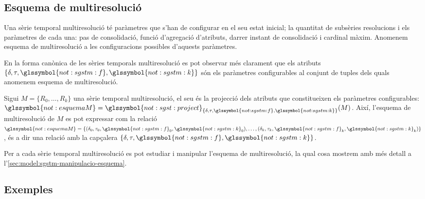 \subsection{Esquema de multiresolució}

Una sèrie temporal multiresolució té paràmetres que
s'han de configurar en el seu estat inicial; la quantitat de subsèries
resolucions i els paràmetres de cada una: pas de consolidació, funció
d'agregació d'atributs, darrer instant de consolidació i cardinal
màxim. Anomenem esquema de multiresolució a les configuracions
possibles d'aquests paràmetres.


En la forma canònica de les sèries temporals multiresolució es pot
observar més clarament que els atributs
$\{\delta,\tau,\glssymbol{not:sgstm:f},\glssymbol{not:sgstm:k}\}$ són
els paràmetres configurables al conjunt de tuples dels quals anomenem
esquema de multiresolució.
\begin{definition}
  \label{def:sgstm:esquema}
  Sigui $M=\{R_0,\dotsc,R_k\}$ una sèrie temporal multiresolució, el
  seu  és la
  projecció dels atributs que constitueixen els paràmetres
  configurables:
  $\glssymbol{not:esquemaM}=\glssymbol{not:sgst:project}_{\{\delta,\tau,\glssymbol{not:sgstm:f},\glssymbol{not:sgstm:k}\}}(M)$. Així,
  l'esquema de multiresolució de $M$ es pot expressar com la relació
  $\glssymbol{not:esquemaM} = \{
  (\delta_0,\tau_0,\glssymbol{not:sgstm:f}_0,\glssymbol{not:sgstm:k}_0),
  \dotsc,
  (\delta_k,\tau_k,\glssymbol{not:sgstm:f}_k,\glssymbol{not:sgstm:k}_k)\}$,
  és a dir una relació amb la capçalera
  $\{\delta,\tau,\glssymbol{not:sgstm:f},\glssymbol{not:sgstm:k}\}$.
\end{definition}


Per a cada sèrie temporal multiresolució es pot estudiar i manipular
l'esquema de multiresolució, la qual cosa mostrem amb més detall a
l'\autoref{sec:model:sgstm-manipulacio-esquema}.





\subsection{Exemples}


